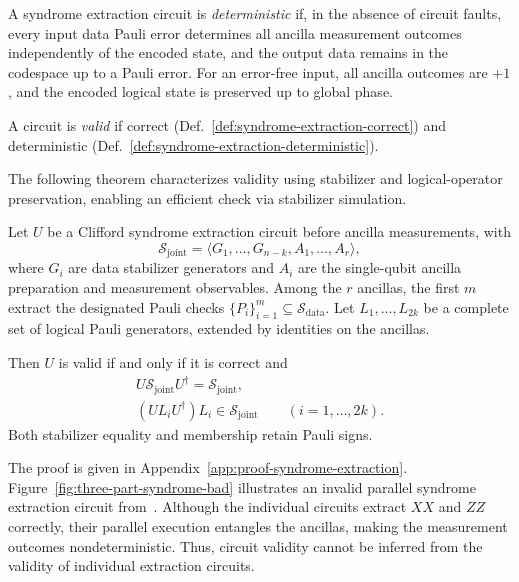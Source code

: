 \documentclass[acmsmall,screen,review,anonymous,nonacm]{acmart}
\begin{document}
\begin{definition}
\label{def:syndrome-extraction-deterministic}
A syndrome extraction circuit is \emph{deterministic}
if, in the absence of circuit faults, every input
data Pauli error determines all ancilla measurement
outcomes independently of the encoded state, and
the output data remains in the codespace up to
a Pauli error. For an error-free input, all ancilla
outcomes are $+1$, and the encoded logical state
is preserved up to global phase.
\end{definition}

\begin{definition}
\label{def:syndrome-extraction-valid}
A circuit is \emph{valid}
if correct
(Def.~\ref{def:syndrome-extraction-correct})
and deterministic
(Def.~\ref{def:syndrome-extraction-deterministic}).
\end{definition}

The following theorem characterizes validity using
stabilizer and logical-operator preservation, enabling
an efficient check via stabilizer simulation.

\begin{theorem}
\label{thm:syndrome-extraction-valid}
Let $U$ be a Clifford syndrome extraction circuit
before ancilla measurements, with
\[
\mathcal{S}_{\mathrm{joint}}
=\langle G_1,\ldots,G_{n-k},A_1,\ldots,A_r\rangle,
\]
where $G_i$ are data stabilizer generators and
$A_i$ are the single-qubit ancilla preparation
and measurement observables. Among the $r$ ancillas,
the first $m$ extract the designated Pauli checks
$\{P_i\}_{i=1}^{m}\subseteq\mathcal{S}_{\mathrm{data}}$.
Let $L_1,\ldots,L_{2k}$ be a complete set of logical
Pauli generators, extended by identities on the ancillas.

Then $U$ is valid if and only if it is correct and
\[
\begin{gathered}
U\mathcal{S}_{\mathrm{joint}}U^\dagger
=\mathcal{S}_{\mathrm{joint}},\\
(UL_iU^\dagger)L_i\in\mathcal{S}_{\mathrm{joint}}
\qquad(i=1,\ldots,2k).
\end{gathered}
\]
Both stabilizer equality and membership retain
Pauli signs.
\end{theorem}

The proof is given in Appendix~\ref{app:proof-syndrome-extraction}.
Figure~\ref{fig:three-part-syndrome-bad} illustrates
an invalid parallel syndrome extraction circuit
from~\cite{KL24}. Although the individual circuits
extract $XX$ and $ZZ$ correctly, their parallel
execution entangles the ancillas, making the
measurement outcomes nondeterministic.
Thus, circuit validity cannot be inferred from
the validity of individual extraction circuits.
\end{document}
